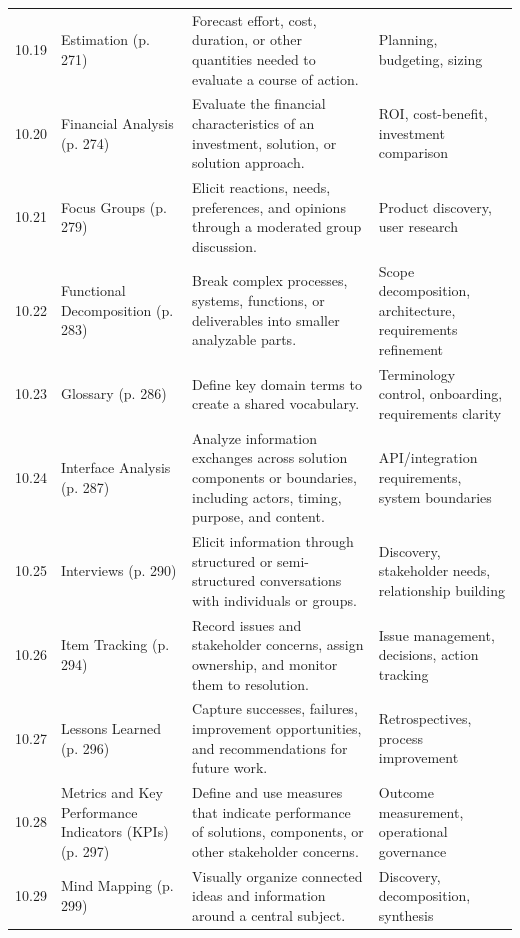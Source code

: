 \documentclass[11pt]{article}
\begin{document}
\begin{longtable}{@{}L{0.06\textwidth} L{0.24\textwidth} L{0.43\textwidth} L{0.18\textwidth}@{}}
10.19 & Estimation \textcolor{BASlate}{\scriptsize (p. 271)} & Forecast effort, cost, duration, or other quantities needed to evaluate a course of action. & Planning, budgeting, sizing\\
10.20 & Financial Analysis \textcolor{BASlate}{\scriptsize (p. 274)} & Evaluate the financial characteristics of an investment, solution, or solution approach. & ROI, cost-benefit, investment comparison\\
10.21 & Focus Groups \textcolor{BASlate}{\scriptsize (p. 279)} & Elicit reactions, needs, preferences, and opinions through a moderated group discussion. & Product discovery, user research\\
10.22 & Functional Decomposition \textcolor{BASlate}{\scriptsize (p. 283)} & Break complex processes, systems, functions, or deliverables into smaller analyzable parts. & Scope decomposition, architecture, requirements refinement\\
10.23 & Glossary \textcolor{BASlate}{\scriptsize (p. 286)} & Define key domain terms to create a shared vocabulary. & Terminology control, onboarding, requirements clarity\\
10.24 & Interface Analysis \textcolor{BASlate}{\scriptsize (p. 287)} & Analyze information exchanges across solution components or boundaries, including actors, timing, purpose, and content. & API/integration requirements, system boundaries\\
10.25 & Interviews \textcolor{BASlate}{\scriptsize (p. 290)} & Elicit information through structured or semi-structured conversations with individuals or groups. & Discovery, stakeholder needs, relationship building\\
10.26 & Item Tracking \textcolor{BASlate}{\scriptsize (p. 294)} & Record issues and stakeholder concerns, assign ownership, and monitor them to resolution. & Issue management, decisions, action tracking\\
10.27 & Lessons Learned \textcolor{BASlate}{\scriptsize (p. 296)} & Capture successes, failures, improvement opportunities, and recommendations for future work. & Retrospectives, process improvement\\
10.28 & Metrics and Key Performance Indicators (KPIs) \textcolor{BASlate}{\scriptsize (p. 297)} & Define and use measures that indicate performance of solutions, components, or other stakeholder concerns. & Outcome measurement, operational governance\\
10.29 & Mind Mapping \textcolor{BASlate}{\scriptsize (p. 299)} & Visually organize connected ideas and information around a central subject. & Discovery, decomposition, synthesis\\

\end{longtable}
\end{document}

